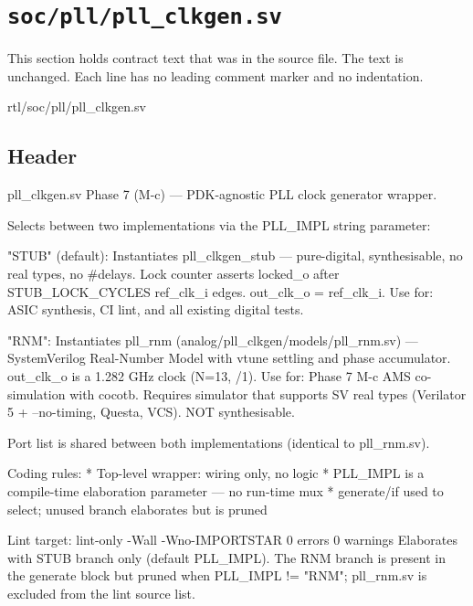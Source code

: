 \section{\texttt{soc/pll/pll\_clkgen.sv}}\label{ds:mod:pll-clkgen}

This section holds contract text that was in the source file. The text is unchanged. Each line has no leading comment marker and no indentation.

\begin{relocated}{rtl/soc/pll/pll_clkgen.sv}

\subsection*{Header}

\begin{textblock}
pll_clkgen.sv
Phase 7 (M-c) — PDK-agnostic PLL clock generator wrapper.

Selects between two implementations via the PLL_IMPL string parameter:

  "STUB" (default):
      Instantiates pll_clkgen_stub — pure-digital, synthesisable,
      no real types, no #delays.  Lock counter asserts locked_o after
      STUB_LOCK_CYCLES ref_clk_i edges.  out_clk_o = ref_clk_i.
      Use for: ASIC synthesis, CI lint, and all existing digital tests.

  "RNM":
      Instantiates pll_rnm (analog/pll_clkgen/models/pll_rnm.sv) —
      SystemVerilog Real-Number Model with vtune settling and phase
      accumulator.  out_clk_o is a 1.282 GHz clock (N=13, /1).
      Use for: Phase 7 M-c AMS co-simulation with cocotb.
      Requires simulator that supports SV real types (Verilator 5 +
      --no-timing, Questa, VCS).  NOT synthesisable.

Port list is shared between both implementations (identical to pll_rnm.sv).

Coding rules:
  * Top-level wrapper: wiring only, no logic
  * PLL_IMPL is a compile-time elaboration parameter — no run-time mux
  * generate/if used to select; unused branch elaborates but is pruned

Lint target: lint-only -Wall -Wno-IMPORTSTAR 0 errors 0 warnings
  Elaborates with STUB branch only (default PLL_IMPL).
  The RNM branch is present in the generate block but pruned when
  PLL_IMPL != "RNM"; pll_rnm.sv is excluded from the lint source list.
\end{textblock}

\end{relocated}

